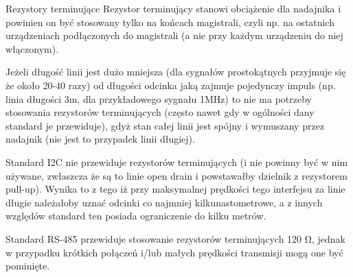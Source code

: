 \begin{ProTip}[breakable]{Rezystory terminujące }
Rezystor terminujący stanowi obciążenie dla nadajnika i powinien on być stosowany tylko na końcach magistrali, czyli np. na ostatnich urządzeniach podłączonych do magistrali (a nie przy każdym urządzeniu do niej włączonym).

\vspace{7pt}

Jeżeli długość linii jest dużo mniejsza (dla sygnałów prostokątnych przyjmuje się że około 20-40 razy) od długości odcinka jaką zajmuje pojedynczy impuls (np. linia długości 3m, dla przykładowego sygnału 1MHz)
to nie ma potrzeby stosowania rezystorów terminujących (często nawet gdy w ogólności dany standard je przewiduje), gdyż stan całej linii jest spójny i wymuszany przez nadajnik (nie jest to przypadek linii długiej).

\vspace{7pt}

Standard I2C nie przewiduje rezystorów terminujących (i nie powinny być w nim używane, zwłaszcza że są to linie open drain i powstawałby dzielnik z rezystorem pull-up).
Wynika to z tego iż przy maksymalnej prędkości tego interfejsu za linie długie należałoby uznać odcinki co najmniej kilkunastometrowe, a z innych względów standard ten posiada ograniczenie do kilku metrów.

Standard RS-485 przewiduje stosowanie rezystorów terminujących 120 Ω, jednak w przypadku krótkich połączeń i/lub małych prędkości transmisji mogą one być pominięte.
\end{ProTip}
